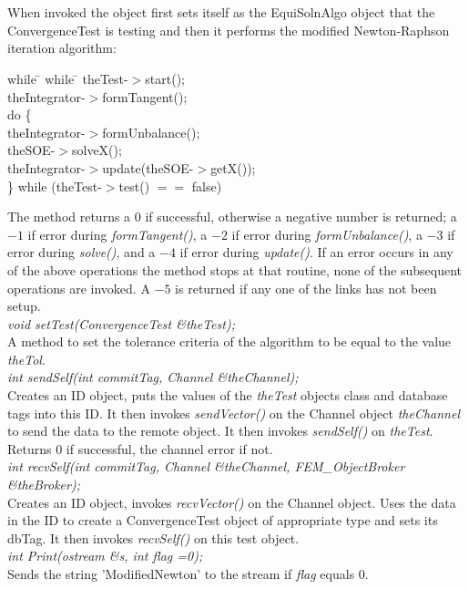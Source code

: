   \\
 \\
When invoked the object first sets itself as the EquiSolnAlgo object
that the ConvergenceTest is testing and then it performs the
modified Newton-Raphson iteration algorithm: 
\begin{tabbing}
while \= \+ while \= \kill
theTest-$>$start(); \\
theIntegrator-$>$formTangent(); \\
do \{ \+ \\
theIntegrator-$>$formUnbalance(); \\
theSOE-$>$solveX(); \\
theIntegrator-$>$update(theSOE-$>$getX()); \- \\
\} while (theTest-$>$test() $==$ false)\- \\
\end{tabbing}


\noindent The method returns a 0 if successful, otherwise a negative number is
returned; a $-1$ if error during {\em formTangent()}, a $-2$ if
error during {\em formUnbalance()}, a $-3$ if error during {\em
solve()}, and a $-4$ if error during {\em update()}.
If an error occurs in any of the above operations the method stops at
that routine, none of the subsequent operations are invoked. A $-5$ is
returned if any one of the links has not been setup.\\

{\em void setTest(ConvergenceTest \&theTest);} \\
A method to set the tolerance criteria of the algorithm to be equal to
the value {\em theTol}. \\

{\em int sendSelf(int commitTag, Channel \&theChannel);}\\
Creates an ID object, puts the values of the {\em theTest} objects
class and database tags into this ID.
It then invokes {\em sendVector()} on the Channel object {\em
theChannel} to send the data to the remote object. It then invokes
{\em sendSelf()} on {\em theTest}. Returns $0$ if successful, the
 channel error if not. \\

{\em int recvSelf(int commitTag, Channel \&theChannel, FEM\_ObjectBroker
\&theBroker);}\\ 
Creates an ID object, invokes {\em recvVector()} on the Channel
object. Uses the data in the ID to create a ConvergenceTest object of
appropriate type and sets its dbTag. It then invokes {\em recvSelf()}
on this test object.  \\

{\em int Print(ostream \&s, int flag =0);} \\
Sends the string 'ModifiedNewton' to the stream if {\em flag} equals $0$.
